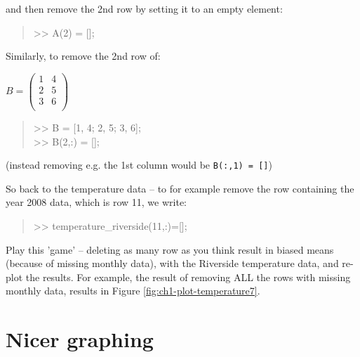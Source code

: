 \documentclass{tufte-book} %
\newenvironment{docspec}{\begin{quotation}\ttfamily\parskip0pt\parindent0pt\ignorespaces}{\end{quotation}}
\begin{document}
\noindent and then remove the 2nd row by setting it to an empty element:

\begin{docspec}
>> A(2) = [];
\end{docspec}

Similarly, to remove the 2nd row of:

\vspace{2mm}
\(B=\begin{pmatrix}1 & 4 \\
2 & 5 \\
3 & 6 \\
\end{pmatrix}\)
\vspace{2mm}

\begin{docspec}
>> B = [1, 4; 2, 5; 3, 6];\\
>> B(2,:) = [];
\end{docspec}

\noindent (instead removing e.g. the 1st column would be \texttt{B(:,1) = []})

So back to the temperature data -- to for example remove the row containing the year 2008 data, which is row 11, we write:

\begin{docspec}
>> temperature\_riverside(11,:)=[];
\end{docspec}

Play this 'game' -- deleting as many row as you think result in biased means (because of missing monthly data), with the Riverside temperature data, and re-plot the results.
For example, the result of removing ALL the rows with missing monthly data, results in Figure \ref{fig:ch1-plot-temperature7}.


\newpage


\section{Nicer graphing}
\end{document}
